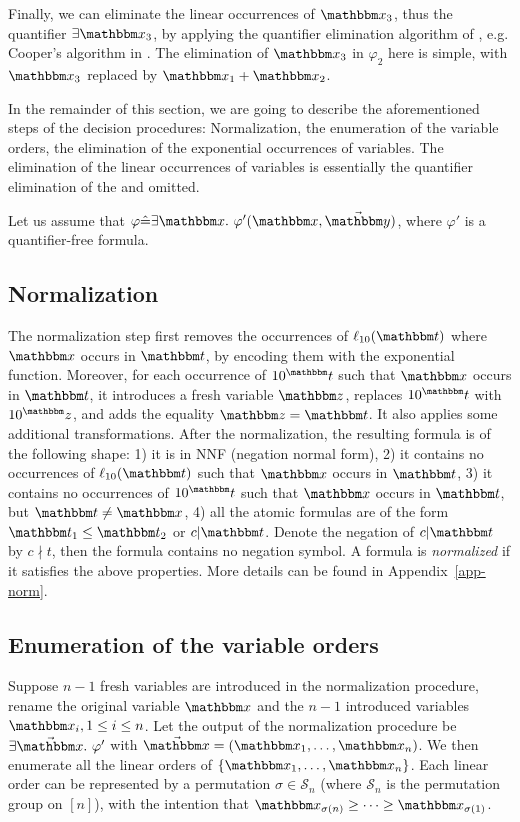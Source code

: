 Finally, we can eliminate the linear occurrences of $\ivarx_3$, thus the quantifier $\exists \ivarx_3$, by applying the quantifier elimination algorithm of {\pa}, e.g. Cooper's algorithm in \cite{Cooper72}. The elimination of $\ivarx_3$ in $\varphi_2$ here is simple, with $\ivarx_3$ replaced by $\ivarx_1 + \ivarx_2$. 

In the remainder of this section, we are going to describe the aforementioned steps of the decision procedures: Normalization, the enumeration of the variable orders, 
the elimination of the exponential occurrences of variables. The elimination of the  linear occurrences of variables is essentially the quantifier elimination of the {\pa} and omitted.

Let us assume that $\varphi \Def \exists \ivarx.\ \varphi'(\ivarx, \vec{\ivary})$, where $\varphi'$ is a quantifier-free formula. 

\vspace*{-3mm}
\subsection{Normalization}

The normalization step first removes the occurrences of $\ell_{10}(\iterm)$ where $\ivarx$ occurs in $\iterm$, by encoding them with the exponential function. Moreover, for each occurrence of $10^\iterm$ such that $\ivarx$ occurs in $\iterm$, it introduces a fresh variable $\ivarz$, replaces $10^\iterm$ with $10^\ivarz$, and adds the equality $\ivarz = \iterm$.  It also applies some additional transformations. After the normalization, the resulting formula is of the following shape: 1) it is in NNF (negation normal form),  2) it contains no occurrences of $\ell_{10}(\iterm)$ such that $\ivarx$ occurs in $\iterm$, 3)  it contains no occurrences of $10^\iterm$ such that $\ivarx$ occurs in $\iterm$, but $\iterm \neq \ivarx$, 4) all the atomic formulas are of the form $\iterm_1 \le \iterm_2$ or $c | \iterm$. Denote the negation of $c | \iterm$ by $c\nmid t$, then the formula contains no negation symbol. A formula is \textit{normalized} if it satisfies the above properties. More details can be found in Appendix~\ref{app-norm}.

\vspace{-2mm}
\subsection{Enumeration of the variable orders} 

Suppose $n-1$ fresh variables are introduced in the normalization procedure, rename the original variable $\ivarx$ and the $n-1$ introduced variables $\ivarx_i,1\le i\le n$.
Let the output of the normalization procedure be $\exists \vec{\ivarx}.\ \varphi'$ with $\vec{\ivarx} = (\ivarx_1,\ldots, \ivarx_n)$. 
We then enumerate all the linear orders of $\{\ivarx_1,\ldots, \ivarx_n\}$. Each linear order can be represented by a permutation $\sigma \in \mathcal{S}_n$ (where $\mathcal{S}_n$ is the permutation group on $[n]$), with the intention that $\ivarx_{\sigma(n)} \ge \cdots \ge \ivarx_{\sigma(1)}$.

